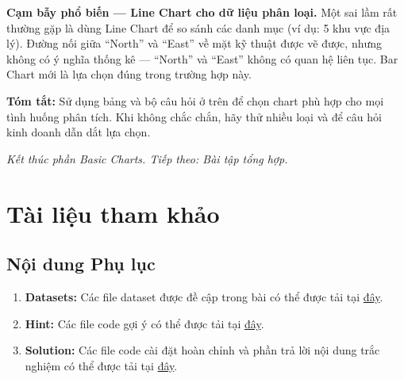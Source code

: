 \documentclass[12pt]{article}
\begin{document}
\begin{notebox}
\textbf{Cạm bẫy phổ biến --- Line Chart cho dữ liệu phân loại.} Một sai lầm rất thường gặp là dùng Line Chart để so sánh các danh mục (ví dụ: 5 khu vực địa lý). Đường nối giữa ``North'' và ``East'' về mặt kỹ thuật được vẽ được, nhưng không có ý nghĩa thống kê --- ``North'' và ``East'' không có quan hệ liên tục. Bar Chart mới là lựa chọn đúng trong trường hợp này.
\end{notebox}

\noindent \textbf{Tóm tắt:} Sử dụng bảng và bộ câu hỏi ở trên để chọn chart phù hợp cho mọi tình huống phân tích. Khi không chắc chắn, hãy thử nhiều loại và để câu hỏi kinh doanh dẫn dắt lựa chọn.

\vspace{1em}
\noindent \textit{Kết thúc phần Basic Charts. Tiếp theo: Bài tập tổng hợp.}

\newpage
\section{Tài liệu tham khảo}
\label{section:references}
\nocite{*}
\vspace{-3.2em}
\printbibliography

\newpage
\begin{appendices}

\section{Nội dung Phụ lục}

\begin{enumerate}
    \item \textbf{Datasets:} Các file dataset được đề cập trong bài có thể được tải tại \href{https://aivietnam.edu.vn/}{đây}.
    \item \textbf{Hint:} Các file code gợi ý có thể được tải tại \href{https://aivietnam.edu.vn/}{đây}.
    \item \textbf{Solution:} Các file code cài đặt hoàn chỉnh và phần trả lời nội dung trắc nghiệm có thể được tải tại \href{https://aivietnam.edu.vn/}{đây}.
\end{enumerate}

\end{appendices}
\end{document}
